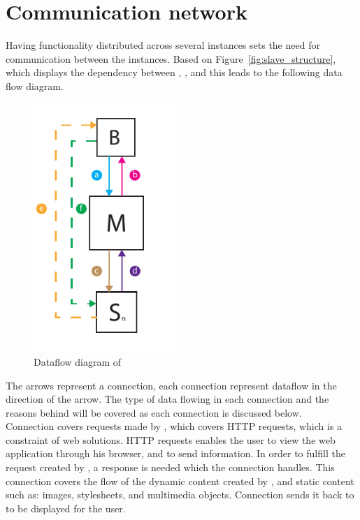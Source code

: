 \section{Communication network}

Having functionality distributed across several instances sets the need for communication between the instances.
Based on Figure~\ref{fig:slave_structure}, which displays the dependency between , , and  this leads to the following data flow diagram. \\


\begin{figure}[!h]
    \centering 
    \includegraphics[width=0.5\textwidth]{gfx/dataflow_diagram.pdf}
    \caption{Dataflow diagram of \projectname{}}
    \label{fig:dataflow_diagrem}
\end{figure}


The arrows represent a connection, each connection represent dataflow in the direction of the arrow.
The type of data flowing in each connection and the reasons behind will be covered as each connection is discussed below. \\

Connection  covers requests made by , which covers HTTP requests, which is a constraint of web solutions.
HTTP requests enables the user to view the web application through his browser, and to send information.
In order to fulfill the request created by , a response is needed which the connection  handles.
This connection covers the flow of the dynamic content created by , and static content such as: images, stylesheets, and multimedia objects.
Connection  sends it back to  to be displayed for the user. \\

